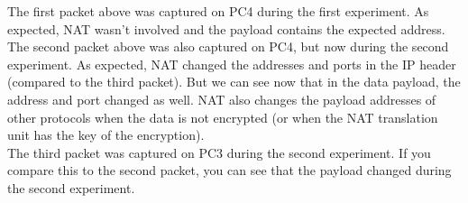 

The first packet above was captured on PC4 during the first experiment. As expected, NAT wasn't involved and the payload contains the expected address. \\
The second packet above was also captured on PC4, but now during the second experiment. As expected, NAT changed the addresses and ports in the IP header (compared to the third packet). But we can see now that in the data payload, the address and port changed as well. NAT also changes the payload addresses of other protocols when the data is not encrypted (or when the NAT translation unit has the key of the encryption). \\
The third packet was captured on PC3 during the second experiment. If you compare this to the second packet, you can see that the payload changed during the second experiment.